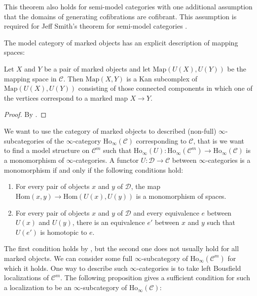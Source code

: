 \documentclass[reqno]{amsart}
\theoremstyle{definition}
\theoremstyle{remark}
\newcommand{\fs}[1]{\mathrm{#1}}
\newcommand{\Hom}{\fs{Hom}}
\newcommand{\Ho}{\fs{Ho}}
\newcommand{\cat}[1]{\mathcal{#1}}
\newcommand{\C}{\cat{C}}
\newcommand{\D}{\cat{D}}
\numberwithin{figure}{section}
\begin{document}
\begin{remark}
This theorem also holds for semi-model categories with one additional assumption that the domains of generating cofibrations are cofibrant.
This assumption is required for Jeff Smith's theorem for semi-model categories \cite[Theorem~3.1]{semi-smith}.
\end{remark}

The model category of marked objects has an explicit description of mapping spaces:

\begin{lem}
Let $X$ and $Y$ be a pair of marked objects and let $\mathrm{Map}(U(X),U(Y))$ be the mapping space in $\C$.
Then $\mathrm{Map}(X,Y)$ is a Kan subcomplex of $\mathrm{Map}(U(X),U(Y))$ consisting of those connected components in which one of the vertices correspond to a marked map $X \to Y$.
\end{lem}
\begin{proof}
By \cite[Lemma~3.4]{marked-obj}.
\end{proof}

We want to use the category of marked objects to described (non-full) $\infty$-subcategories of the $\infty$-category $\Ho_\infty(\C)$ corresponding to $\C$,
that is we want to find a model structure on $\C^m$ such that $\Ho_\infty(U) : \Ho_\infty(\C^m) \to \Ho_\infty(\C)$ is a monomorphism of $\infty$-categories.
A functor $U : \D \to \C$ between $\infty$-categories is a monomorphism if and only if the following conditions hold:
\begin{enumerate}
\item \label{it:mono-hom} For every pair of objects $x$ and $y$ of $\D$, the map $\Hom(x,y) \to \Hom(U(x),U(y))$ is a monomorphism of spaces.
\item \label{it:mono-eq} For every pair of objects $x$ and $y$ of $\D$ and every equivalence $e$ between $U(x)$ and $U(y)$, there is an equivalence $e'$ between $x$ and $y$ such that $U(e')$ is homotopic to $e$.
\end{enumerate}

The first condition holds by , but the second one does not usually hold for all marked objects.
We can consider some full $\infty$-subcategory of $\Ho_\infty(\C^m)$ for which it holds.
One way to describe such $\infty$-categories is to take left Bousfield localizations of $\C^m$.
The following proposition gives a sufficient condition for such a localization to be an $\infty$-subcategory of $\Ho_\infty(\C)$:
\end{document}
